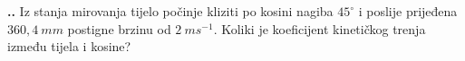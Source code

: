 

\noindent 
\textbf{
\thecjelina.\thezadatak.}
Iz stanja mirovanja tijelo počinje kliziti po kosini nagiba $45^\circ$ i poslije prijeđena  $360,4\ mm$ postigne brzinu od $2\ ms^{-1}$. Koliki je koeficijent kinetičkog trenja između tijela i kosine?


